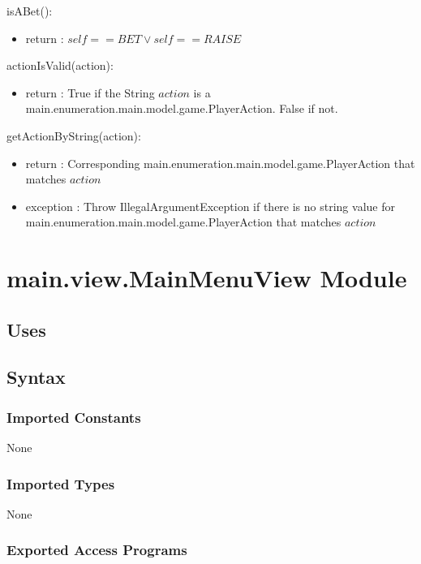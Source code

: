 \documentclass[12pt, titlepage]{article}
\begin{document}
        \noindent isABet():
        \begin{itemize}
        \item return : $self == BET \vee self == RAISE$
        \end{itemize}
        
        \noindent actionIsValid(action):
        \begin{itemize}
        \item return : True if the String $action$ is a main.enumeration.main.model.game.PlayerAction. False if not.
        \end{itemize}
        
        \noindent getActionByString(action):
        \begin{itemize}
        \item return : Corresponding main.enumeration.main.model.game.PlayerAction that matches $action$
        \item exception : Throw IllegalArgumentException if there is no  string value for main.enumeration.main.model.game.PlayerAction that matches $action$
        \end{itemize}
         
        
        
        
\section* {main.view.MainMenuView Module}
    \subsection* {Uses}
    \subsection* {Syntax}
    
        \subsubsection* {Imported Constants}
            None
        \subsubsection* {Imported Types}
            None
        \subsubsection* {Exported Access Programs}
        
\end{document}
